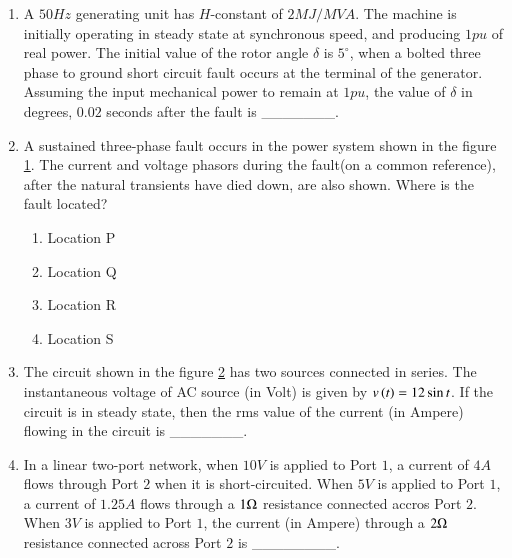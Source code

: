 \documentclass[journal]{IEEEtran}
\begin{document}
\begin{enumerate}
    \item A $50 Hz$ generating unit has $H$-constant of $2 MJ/MVA$. The machine is initially operating in steady state at synchronous speed, and producing $1 pu$ of real power. The initial value of the rotor angle $\delta$ is $5^{\circ}$, when a bolted three phase to ground short circuit fault occurs at the terminal of the generator. Assuming the input mechanical power to remain at $1pu$, the value of $\delta$ in degrees, $0.02$ seconds after the fault is \_\_\_\_\_\_\_.

    \item A sustained three-phase fault occurs in the power system shown in the figure \ref{fig54}. The current and voltage phasors during the fault(on a common reference), after the natural transients have died down, are also shown. Where is the fault located?
    \begin{figure}[H]
        \centering
        
        \caption{}
        \label{fig54}
    \end{figure}
    \begin{enumerate}
        \item Location P
        \item Location Q
        \item Location R
        \item Location S
    \end{enumerate}

    \item The circuit shown in the figure \ref{fig55} has two sources connected in series. The instantaneous voltage of AC source (in Volt) is given by $v\left(t\right) = 12 \sin t$. If the circuit is in steady state, then the rms value of the current (in Ampere) flowing in the circuit is \_\_\_\_\_\_\_.
    \begin{figure}[H]
        \centering
        
        \caption{}
        \label{fig55}
    \end{figure}

    \item In a linear two-port network, when $10V$ is applied to Port $1$, a current of $4A$ flows through Port $2$ when it is short-circuited. When $5V$ is applied to Port $1$, a current of $1.25A$ flows through a $1 \ohm$ resistance connected accros Port $2$. When $3V$ is applied to Port $1$, the current (in Ampere) through a $2 \ohm$ resistance connected across Port $2$ is \_\_\_\_\_\_\_\_.


\end{enumerate}
\end{document}
